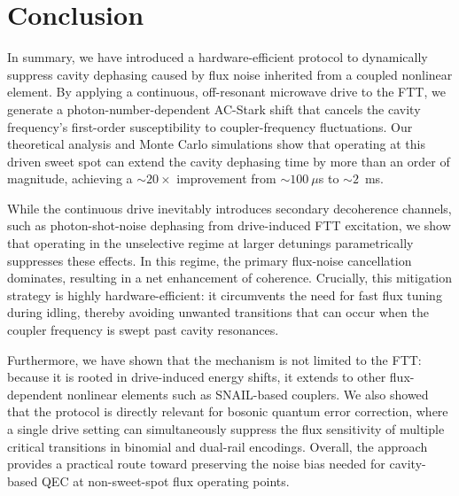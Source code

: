 \section{Conclusion}
\label{sec5}
In summary, we have introduced a hardware-efficient protocol to dynamically suppress cavity dephasing caused by flux noise inherited from a coupled nonlinear element. By applying a continuous, off-resonant microwave drive to the FTT, we generate a photon-number-dependent AC-Stark shift that cancels the cavity frequency's first-order susceptibility to coupler-frequency fluctuations. Our theoretical analysis and Monte Carlo simulations show that operating at this driven sweet spot can extend the cavity dephasing time by more than an order of magnitude, achieving a ${\sim}20\times$ improvement from ${\sim}100~\mu$s to ${\sim}2$~ms.

While the continuous drive inevitably introduces secondary decoherence channels, such as photon-shot-noise dephasing from drive-induced FTT excitation, we show that operating in the unselective regime at larger detunings parametrically suppresses these effects. In this regime, the primary flux-noise cancellation dominates, resulting in a net enhancement of coherence. Crucially, this mitigation strategy is highly hardware-efficient: it circumvents the need for fast flux tuning during idling, thereby avoiding unwanted transitions that can occur when the coupler frequency is swept past cavity resonances.

Furthermore, we have shown that the mechanism is not limited to the FTT: because it is rooted in drive-induced energy shifts, it extends to other flux-dependent nonlinear elements such as SNAIL-based couplers. We also showed that the protocol is directly relevant for bosonic quantum error correction, where a single drive setting can simultaneously suppress the flux sensitivity of multiple critical transitions in binomial and dual-rail encodings. Overall, the approach provides a practical route toward preserving the noise bias needed for cavity-based QEC at non-sweet-spot flux operating points.